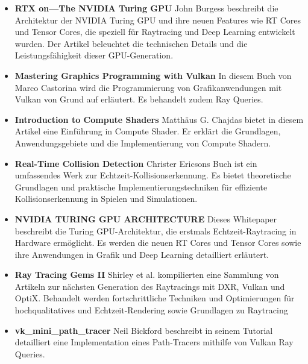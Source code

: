 \documentclass[11pt]{scrartcl}
\begin{document}
	\begin{itemize}
	\item \textbf{RTX on—The NVIDIA Turing GPU}\cite{Burgess2020} John Burgess beschreibt die Architektur der NVIDIA Turing GPU und ihre neuen Features wie RT Cores und Tensor Cores, die speziell für Raytracing und Deep Learning entwickelt wurden. Der Artikel beleuchtet die technischen Details und die Leistungsfähigkeit dieser GPU-Generation.
	
	\item \textbf{Mastering Graphics Programming with Vulkan}\cite{Castorina2023} In diesem Buch von Marco Castorina wird die Programmierung von Grafikanwendungen mit Vulkan von Grund auf erläutert. Es behandelt zudem Ray Queries.
	
	\item \textbf{Introduction to Compute Shaders}\cite{Chajdas2018} Matthäus G. Chajdas bietet in diesem Artikel eine Einführung in Compute Shader. Er erklärt die Grundlagen, Anwendungsgebiete und die Implementierung von Compute Shadern.
	
	\item \textbf{Real-Time Collision Detection}\cite{Ericson2004} Christer Ericsons Buch ist ein umfassendes Werk zur Echtzeit-Kollisionserkennung. Es bietet theoretische Grundlagen und praktische Implementierungstechniken für effiziente Kollisionserkennung in Spielen und Simulationen.
	
	\item \textbf{NVIDIA TURING GPU ARCHITECTURE}\cite{Corporation2018} Dieses Whitepaper beschreibt die Turing GPU-Architektur, die erstmals Echtzeit-Raytracing in Hardware ermöglicht. Es werden die neuen RT Cores und Tensor Cores sowie ihre Anwendungen in Grafik und Deep Learning detailliert erläutert.
	
	\item \textbf{Ray Tracing Gems II}\cite{Marrs2021} Shirley et al. kompilierten eine Sammlung von Artikeln zur nächsten Generation des Raytracings mit DXR, Vulkan und OptiX. Behandelt werden fortschrittliche Techniken und Optimierungen für hochqualitatives und Echtzeit-Rendering sowie Grundlagen zu Raytracing
	
	\item \textbf{vk\_mini\_path\_tracer}\cite{Bickford} Neil Bickford beschreibt in seinem Tutorial detailliert eine Implementation eines Path-Tracers mithilfe von Vulkan Ray Queries.
	\end{itemize}

	
	
\end{document}
